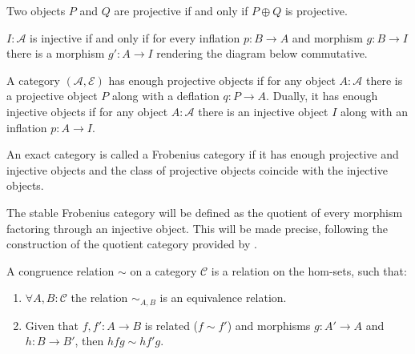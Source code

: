     \begin{corollary}
        Two objects $P$ and $Q$ are projective if and only if $P\oplus Q$ is projective.
    \end{corollary}

    \begin{corollary}
        $I:\mathcal{A}$ is injective if and only if for every inflation $p:B\rightarrow A$ and morphism $g:B\rightarrow I$ there is a morphism $g':A\rightarrow I$ rendering the diagram below commutative.
        \begin{center}
        \end{center}
    \end{corollary}

    \begin{definition}
        A category $(\mathcal{A}, \mathcal{E})$ has enough projective objects if for any object $A:\mathcal{A}$ there is a projective object $P$ along with a deflation $q:P\rightarrow A$. Dually, it has enough injective objects if for any object $A:\mathcal{A}$ there is an injective object $I$ along with an inflation $p:A\rightarrow I$.
    \end{definition}

    \begin{definition}
        An exact category is called a Frobenius category if it has enough projective and injective objects and the class of projective objects coincide with the injective objects.
    \end{definition}

    The stable Frobenius category will be defined as the quotient of every morphism factoring through an injective object. This will be made precise, following the construction of the quotient category provided by \cite{Mac71}.

    \begin{definition}
        A congruence relation $\sim$ on a category $\mathcal{C}$ is a relation on the hom-sets, such that:
        \begin{enumerate}
            \item $\forall A,B:\mathcal{C}$ the relation $\sim_{A,B}$ is an equivalence relation.
            \item Given that $f,f':A\rightarrow B$ is related ($f\sim f'$) and morphisms $g:A'\rightarrow A$ and $h:B\rightarrow B'$, then $hfg\sim hf'g$.
        \end{enumerate}
    \end{definition}

